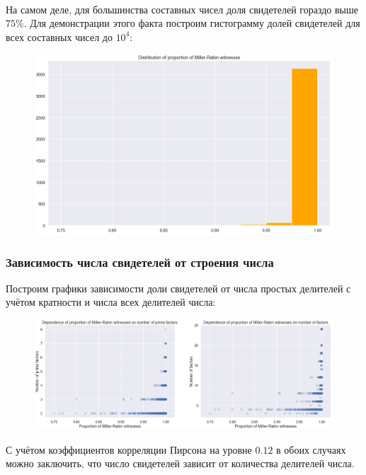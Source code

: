 \documentclass[12pt]{article}
\theoremstyle{definition}
\numberwithin{Def}{section}
\numberwithin{Th}{section}
\numberwithin{St}{section}
\numberwithin{Cor}{section}
\begin{document}
\paragraph{} На самом деле, для большинства составных чисел доля свидетелей
гораздо выше $75\%$. Для демонстрации этого факта построим гистограмму долей
свидетелей для всех составных чисел до $10^4$:

\begin{figure}[H]
 	\includegraphics[width=\linewidth]{miller-rabin.png}
\end{figure}

\subsubsection{Зависимость числа свидетелей от строения числа}

Построим графики зависимости доли свидетелей от числа простых делителей с
учётом кратности и числа всех делителей числа:

\begin{figure}[H]
 	\includegraphics[width=\linewidth]{factors.png}
\end{figure}

С учётом коэффициентов корреляции Пирсона на уровне $0.12$ в обоих случаях
можно заключить, что число свидетелей зависит от количества делителей числа. 
\end{document}
